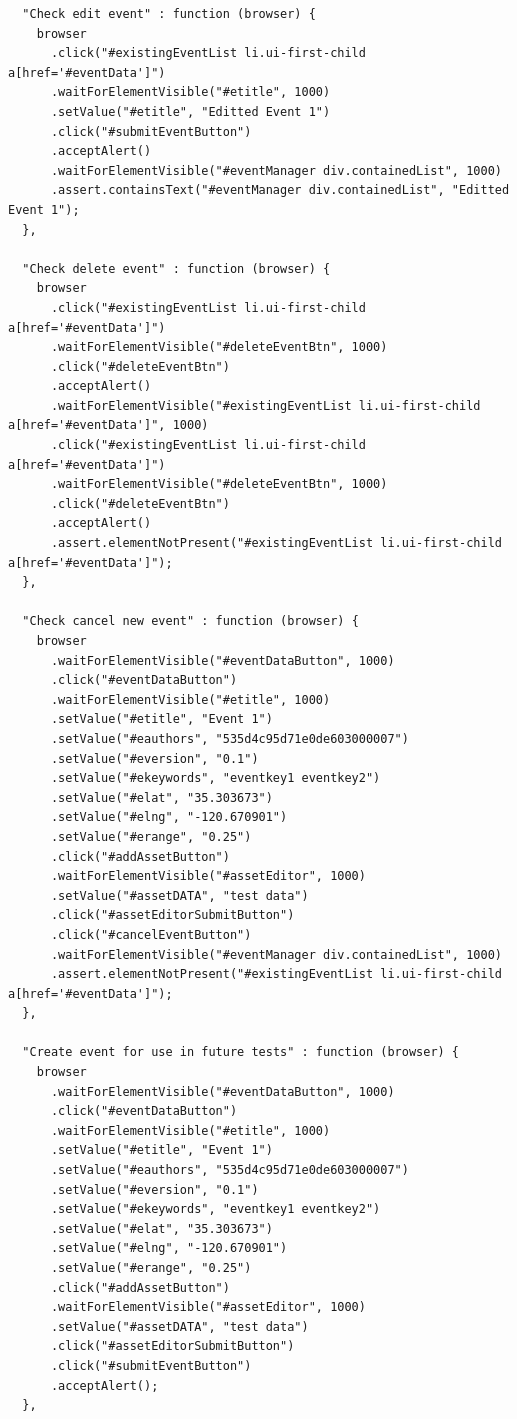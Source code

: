 \documentclass[12pt]{ucthesis}
\begin{document}
\begin{lstlisting}
  "Check edit event" : function (browser) {
    browser
      .click("#existingEventList li.ui-first-child a[href='#eventData']")
      .waitForElementVisible("#etitle", 1000)
      .setValue("#etitle", "Editted Event 1")
      .click("#submitEventButton")
      .acceptAlert()
      .waitForElementVisible("#eventManager div.containedList", 1000)
      .assert.containsText("#eventManager div.containedList", "Editted Event 1");
  },

  "Check delete event" : function (browser) {
    browser
      .click("#existingEventList li.ui-first-child a[href='#eventData']")
      .waitForElementVisible("#deleteEventBtn", 1000)
      .click("#deleteEventBtn")
      .acceptAlert()
      .waitForElementVisible("#existingEventList li.ui-first-child a[href='#eventData']", 1000)
      .click("#existingEventList li.ui-first-child a[href='#eventData']")
      .waitForElementVisible("#deleteEventBtn", 1000)
      .click("#deleteEventBtn")
      .acceptAlert()
      .assert.elementNotPresent("#existingEventList li.ui-first-child a[href='#eventData']");
  },

  "Check cancel new event" : function (browser) {
    browser
      .waitForElementVisible("#eventDataButton", 1000)
      .click("#eventDataButton")
      .waitForElementVisible("#etitle", 1000)
      .setValue("#etitle", "Event 1")
      .setValue("#eauthors", "535d4c95d71e0de603000007")
      .setValue("#eversion", "0.1")
      .setValue("#ekeywords", "eventkey1 eventkey2")
      .setValue("#elat", "35.303673")
      .setValue("#elng", "-120.670901")
      .setValue("#erange", "0.25")
      .click("#addAssetButton")
      .waitForElementVisible("#assetEditor", 1000)
      .setValue("#assetDATA", "test data")
      .click("#assetEditorSubmitButton")
      .click("#cancelEventButton")
      .waitForElementVisible("#eventManager div.containedList", 1000)
      .assert.elementNotPresent("#existingEventList li.ui-first-child a[href='#eventData']");
  },

  "Create event for use in future tests" : function (browser) {
    browser
      .waitForElementVisible("#eventDataButton", 1000)
      .click("#eventDataButton")
      .waitForElementVisible("#etitle", 1000)
      .setValue("#etitle", "Event 1")
      .setValue("#eauthors", "535d4c95d71e0de603000007")
      .setValue("#eversion", "0.1")
      .setValue("#ekeywords", "eventkey1 eventkey2")
      .setValue("#elat", "35.303673")
      .setValue("#elng", "-120.670901")
      .setValue("#erange", "0.25")
      .click("#addAssetButton")
      .waitForElementVisible("#assetEditor", 1000)
      .setValue("#assetDATA", "test data")
      .click("#assetEditorSubmitButton")
      .click("#submitEventButton")
      .acceptAlert();
  },


\end{lstlisting}
\end{document}
